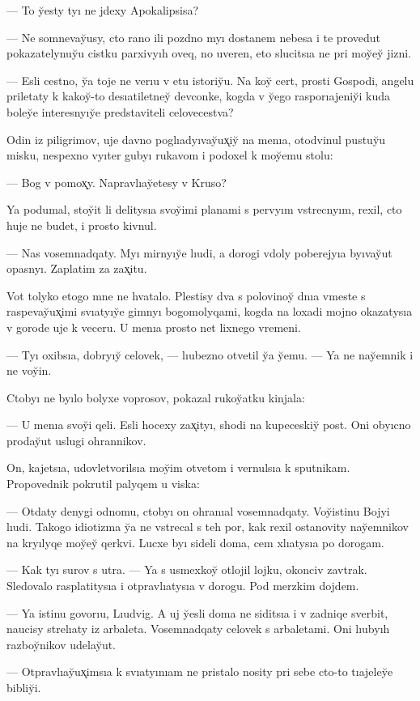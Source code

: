 \documentclass[10pt]{book}
\begin{document}
— To y̆esty tyı ne jdexy Apokalipsisa?

— Ne somnevay̆usy, cto rano ili pozdno myı dostanem nebesa i te provedut pokazatelynuy̆u cistku parxivyıh oveq, no uveren, eto slucitsıa ne pri moy̆ey̆ jizni.

— Esli cestno, y̆a toje ne verıu v etu istoriy̆u. Na koy̆ cert, prosti Gospodi, angelu priletaty k kakoy̆-to desıatiletney̆ devconke, kogda v y̆ego rasporıajeniy̆i kuda boley̆e interesnyıy̆e predstaviteli celovecestva?

Odin iz piligrimov, uje davno poglıadyıvay̆ux̨iy̆ na menıa, otodvinul pustuy̆u misku, nespexno vyıter gubyı rukavom i podoxel k moy̆emu stolu:

— Bog v pomox̨y. Napravlıay̆etesy v Kruso?

Ya podumal, stoy̆it li delitysıa svoy̆imi planami s pervyım vstrecnyım, rexil, cto huje ne budet, i prosto kivnul.

— Nas vosemnadqaty. Myı mirnyıy̆e lıudi, a dorogi vdoly poberejyıa byıvay̆ut opasnyı. Zaplatim za zax̨itu.

Vot tolyko etogo mne ne hvatalo. Plestisy dva s polovinoy̆ dnıa vmeste s raspevay̆ux̨imi svıatyıy̆e gimnyı bogomolyqami, kogda na loxadi mojno okazatysıa v gorode uje k veceru. U menıa prosto net lixnego vremeni.

— Tyı oxibsıa, dobryıy̆ celovek, — lıubezno otvetil y̆a y̆emu. — Ya ne nay̆emnik i ne voy̆in.

Ctobyı ne byılo bolyxe voprosov, pokazal rukoy̆atku kinjala:

— U menıa svoy̆i qeli. Esli hocexy zax̨ityı, shodi na kupeceskiy̆ post. Oni obyıcno proday̆ut uslugi ohrannikov.

On, kajetsıa, udovletvorilsıa moy̆im otvetom i vernulsıa k sputnikam. Propovednik pokrutil palyqem u viska:

— Otdaty denygi odnomu, ctobyı on ohranıal vosemnadqaty. Voy̆istinu Bojyi lıudi. Takogo idiotizma y̆a ne vstrecal s teh por, kak rexil ostanovity nay̆emnikov na kryılyqe moy̆ey̆ qerkvi. Lucxe byı sideli doma, cem xlıatysıa po dorogam.

— Kak tyı surov s utra. — Ya s usmexkoy̆ otlojil lojku, okonciv zavtrak. Sledovalo rasplatitysıa i otpravlıatysıa v dorogu. Pod merzkim dojdem.

— Ya istinu govorıu, Lıudvig. A uj y̆esli doma ne siditsıa i v zadniqe sverbit, naucisy strelıaty iz arbaleta. Vosemnadqaty celovek s arbaletami. Oni lıubyıh razboy̆nikov udelay̆ut.

— Otpravlıay̆ux̨imsıa k svıatyınıam ne pristalo nosity pri sebe cto-to tıajeley̆e bibliy̆i.
\end{document}
